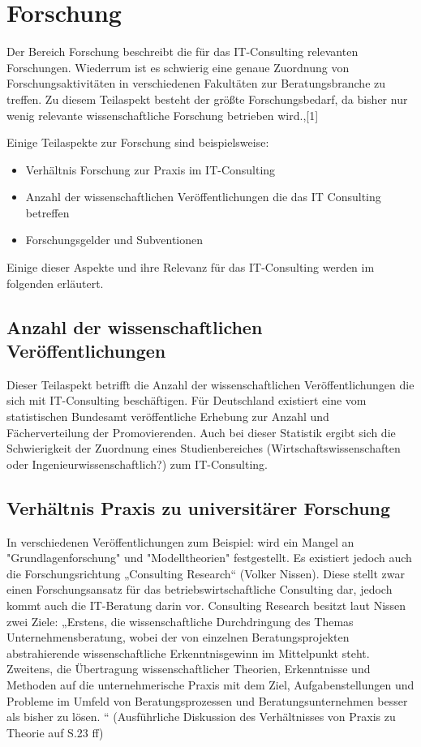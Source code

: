 \section{Forschung}
Der Bereich Forschung beschreibt die für das IT-Consulting relevanten Forschungen. Wiederrum ist es schwierig eine genaue Zuordnung von Forschungsaktivitäten in verschiedenen Fakultäten zur Beratungsbranche zu treffen. Zu diesem Teilaspekt besteht der größte Forschungsbedarf, da bisher nur wenig relevante wissenschaftliche Forschung betrieben wird.\cite[10]{nissen2007consulting},\cite{IDSScheer}[1]

Einige Teilaspekte zur Forschung sind beispielsweise:
\begin{itemize}
\item Verhältnis Forschung zur Praxis im IT-Consulting
\item Anzahl der wissenschaftlichen Veröffentlichungen die das IT Consulting betreffen
\item Forschungsgelder und Subventionen
\end{itemize}

Einige dieser Aspekte und ihre Relevanz für das IT-Consulting werden im folgenden erläutert.

\subsection{Anzahl der wissenschaftlichen Veröffentlichungen}
Dieser Teilaspekt betrifft die Anzahl der wissenschaftlichen Veröffentlichungen die sich mit IT-Consulting beschäftigen. 
Für Deutschland existiert eine vom statistischen Bundesamt veröffentliche Erhebung zur Anzahl und Fächerverteilung der Promovierenden.\cite{destatis}
Auch bei dieser Statistik ergibt sich die Schwierigkeit der Zuordnung eines Studienbereiches (Wirtschaftswissenschaften oder Ingenieurwissenschaftlich?) zum IT-Consulting. 

\subsection{Verhältnis Praxis zu universitärer Forschung}
In verschiedenen Veröffentlichungen zum Beispiel: \cite[1]{IDSScheer} wird ein Mangel an "Grundlagenforschung" und "Modelltheorien" festgestellt. Es existiert jedoch auch die Forschungsrichtung „Consulting Research“ (Volker Nissen). Diese stellt zwar einen Forschungsansatz für das betriebswirtschaftliche Consulting dar, jedoch kommt auch  die IT-Beratung darin vor. Consulting Research besitzt laut Nissen zwei Ziele: „Erstens, die wissenschaftliche Durchdringung des Themas Unternehmensberatung, wobei der von einzelnen Beratungsprojekten abstrahierende wissenschaftliche Erkenntnisgewinn im Mittelpunkt steht. Zweitens, die Übertragung wissenschaftlicher Theorien, Erkenntnisse und Methoden auf die unternehmerische Praxis mit dem Ziel, Aufgabenstellungen und Probleme im Umfeld von Beratungsprozessen und Beratungsunternehmen besser als bisher zu lösen. “
(Ausführliche Diskussion des Verhältnisses von Praxis zu Theorie auf S.23 ff)

